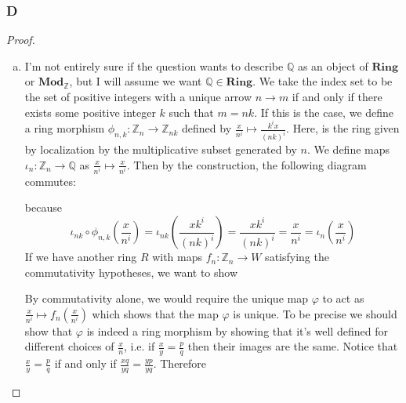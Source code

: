\documentclass{article}
\newcommand{\Z}{\mathbb{Z}}
\newcommand{\Q}{\mathbb{Q}}
\newcommand{\Ring}{\mathbf{Ring}} %
\newcommand{\Mod}{\mathbf{Mod}} %
\begin{document}
\subsubsection{D}\label{1.4.D}
\begin{proof}
    \begin{enumerate}[(a)]
        \item I'm not entirely sure if the question wants to describe $\Q$ as an object of $\Ring$ or $\Mod_\Z$, but I will assume we want $\Q\in \Ring$. We take the index set to be the set of positive integers with a unique arrow $n\to m$ if and only if there exists some positive integer $k$ such that $m=nk$. If this is the case, we define a ring morphism $\phi_{n,k}:\Z_n \to \Z_{nk}$ defined by $\frac{x}{n^i}\mapsto \frac{k^ix}{(nk)^i}$. Here, is the ring given by localization by the multiplicative subset generated by $n$. We define maps $\iota_n:\Z_n\to \Q$ as $\frac{x}{n^i}\mapsto \frac{x}{n^i}$. Then by the construction, the following diagram commutes:
        \begin{center}
        \end{center}
        because
        \[
        \iota_{nk}\circ \phi_{n,k}(\frac{x}{n^i})=\iota_{nk}(\frac{xk^i}{(nk)^i})=\frac{xk^i}{(nk)^i}=\frac{x}{n^i}=\iota_n(\frac{x}{n^i})
        \]
        If we have another ring $R$ with maps $f_n:\Z_n\to W$ satisfying the commutativity hypotheses, we want to show
        \begin{center}
        \end{center}
        By commutativity alone, we would require the unique map $\varphi$ to act as $\frac{x}{n^i}\mapsto f_n(\frac{x}{n^i})$ which shows that the map $\varphi$ is unique. To be precise we should show that $\varphi$ is indeed a ring morphism by showing that it's well defined for different choices of $\frac{x}{n}$, i.e. if $\frac{x}{y}=\frac{p}{q}$ then their images are the same. Notice that $\frac{x}{y}=\frac{p}{q}$ if and only if $\frac{xq}{yq}=\frac{yp}{yq}$. Therefore

\end{enumerate}
\end{proof}
\end{document}
